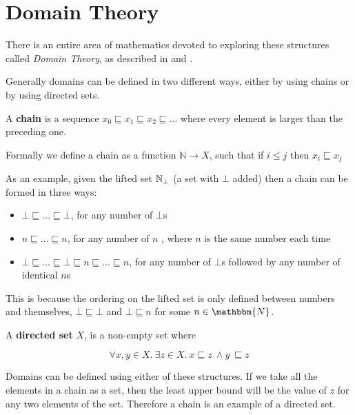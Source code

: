 \section{Domain Theory}\label{dom}
There is an entire area of mathematics devoted to exploring these structures called \emph{Domain Theory}, as described in \citep{Gunter92} and  \citep{Hutton14}.

Generally domains can be defined in two different ways, either by using chains or by using directed sets.

\vspace{0.5cm}

\begin{defn}
A \textbf{chain} is a sequence $x_0 \sqsubseteq x_1 \sqsubseteq x_2 \sqsubseteq \dots $ where every element is larger than the preceding one.

\vspace{0.5cm}

Formally we define a chain as a function $\mathbb{N} \to X$, such that if $i \leq j$ then $x_i \sqsubseteq x_j$
\end{defn}

As an example, given the lifted set  $\mathbb{N}_{\bot}$ (a set with $\bot$ added) then a chain can be formed in three ways:

\begin{itemize}
\item{$\bot \sqsubseteq \dots \sqsubseteq \bot$, for any number of $\bot$s}
\item{$n \sqsubseteq \dots \sqsubseteq n$, for any number of $n$ , where $n$ is the same number each time}
\item{$\bot \sqsubseteq \dots \sqsubseteq \bot \sqsubseteq n \sqsubseteq \dots \sqsubseteq n$, for any number of $\bot$s followed by any number of identical $n$s}
\end{itemize}

This is because the ordering on the lifted set is only defined between numbers and themselves, $\bot \sqsubseteq \bot$ and $\bot \sqsubseteq n$ for some $n \in \mathbbm{N}$.

\vspace{0.5cm}
 
\begin{defn}
A \textbf{directed set} $X$, is a non-empty set where

\[ \forall x,y \in X. \ \exists z \in X. \ x \sqsubseteq z \ \wedge y \ \sqsubseteq z \]
\end{defn}

Domains can be defined using either of these structures.  If we take all the elements in a chain as a set, then the least upper bound will be the value of $z$ for any two elements of the set. Therefore a chain is an example of a directed set.


